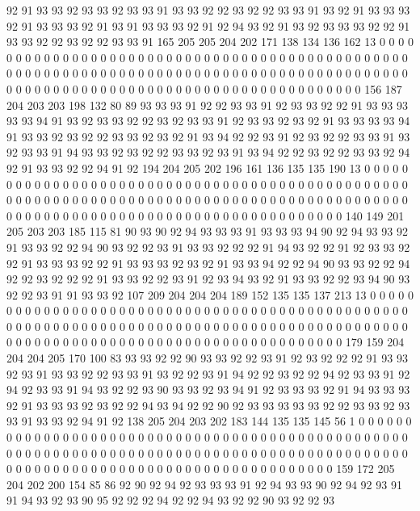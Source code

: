 92 91 93 93 92 93 93 92 93 93 91 93 93 92 92 93 92 92 93 93
91 93 92 91 93 93 93 92 91 93 93 93 92 91 93 91 93 93 93 92
91 92 94 93 92 91 93 92 93 93 93 92 92 91 93 93 92 92 93 92
92 93 93 91 165 205 205 204 202 171 138 134 136 162 13 0 0 0 0 0
0 0 0 0 0 0 0 0 0 0 0 0 0 0 0 0 0 0 0 0
0 0 0 0 0 0 0 0 0 0 0 0 0 0 0 0 0 0 0 0
0 0 0 0 0 0 0 0 0 0 0 0 0 0 0 0 0 0 0 0
0 0 0 0 0 0 0 0 0 0 0 0 0 0 0 0 0 0 0 0
0 0 0 0 0 0 0 0 0 0 0 0 0 0 0 0 0 0 0 0
0 0 0 0 0 0 0 0 0 0 0 0 0 0 0 0 0 0 0 0
0 0 0 156 187 204 203 203 198 132 80 89 93 93 93 91 92 92 93 93
91 92 93 93 92 92 91 93 93 93 93 93 94 91 93 92 93 93 92 92
93 92 93 93 91 92 93 93 92 93 92 91 93 93 93 93 94 91 93 93
92 93 92 92 93 93 92 93 92 91 93 94 92 92 93 91 92 93 92 92
93 93 91 93 92 93 93 91 94 93 93 92 93 92 92 93 93 92 93 91
93 94 92 92 93 92 92 93 93 92 94 92 91 93 93 92 92 94 91 92
194 204 205 202 196 161 136 135 135 190 13 0 0 0 0 0 0 0 0 0
0 0 0 0 0 0 0 0 0 0 0 0 0 0 0 0 0 0 0 0
0 0 0 0 0 0 0 0 0 0 0 0 0 0 0 0 0 0 0 0
0 0 0 0 0 0 0 0 0 0 0 0 0 0 0 0 0 0 0 0
0 0 0 0 0 0 0 0 0 0 0 0 0 0 0 0 0 0 0 0
0 0 0 0 0 0 0 0 0 0 0 0 0 0 0 0 0 0 0 0
0 0 0 0 0 0 0 0 0 0 0 0 0 0 0 0 0 0 140 149
201 205 203 203 185 115 81 90 93 90 92 94 93 93 93 91 93 93 93 94
90 92 94 93 93 92 91 93 93 92 92 94 90 93 92 92 93 91 93 93
92 92 92 91 94 93 92 92 91 92 93 93 92 92 91 93 93 93 92 92
91 93 93 93 92 93 92 91 93 93 94 92 92 94 90 93 93 92 92 94
92 92 93 92 92 92 91 93 93 92 92 93 91 92 93 94 93 92 91 93
93 92 92 93 94 90 93 92 92 93 91 91 93 93 92 107 209 204 204 204
189 152 135 135 137 213 13 0 0 0 0 0 0 0 0 0 0 0 0 0
0 0 0 0 0 0 0 0 0 0 0 0 0 0 0 0 0 0 0 0
0 0 0 0 0 0 0 0 0 0 0 0 0 0 0 0 0 0 0 0
0 0 0 0 0 0 0 0 0 0 0 0 0 0 0 0 0 0 0 0
0 0 0 0 0 0 0 0 0 0 0 0 0 0 0 0 0 0 0 0
0 0 0 0 0 0 0 0 0 0 0 0 0 0 0 0 0 0 0 0
0 0 0 0 0 0 0 0 0 0 0 0 0 0 179 159 204 204 204 205
170 100 83 93 93 92 92 90 93 93 92 92 93 91 92 93 92 92 92 91
93 93 92 93 91 93 93 92 92 93 93 91 93 92 92 93 91 94 92 92
93 92 92 94 92 93 93 91 92 94 92 93 93 91 94 93 92 92 93 90
93 93 92 93 94 91 92 93 93 93 92 91 94 93 93 93 92 91 93 93
93 92 93 92 92 94 93 94 92 92 90 92 93 93 93 93 93 92 92 93
93 92 93 93 91 93 93 92 94 91 92 138 205 204 203 202 183 144 135 135
145 56 1 0 0 0 0 0 0 0 0 0 0 0 0 0 0 0 0 0
0 0 0 0 0 0 0 0 0 0 0 0 0 0 0 0 0 0 0 0
0 0 0 0 0 0 0 0 0 0 0 0 0 0 0 0 0 0 0 0
0 0 0 0 0 0 0 0 0 0 0 0 0 0 0 0 0 0 0 0
0 0 0 0 0 0 0 0 0 0 0 0 0 0 0 0 0 0 0 0
0 0 0 0 0 0 0 0 0 0 0 0 0 0 0 0 0 0 0 0
0 0 0 0 0 0 0 0 0 0 159 172 205 204 202 200 154 85 86 92
90 92 94 92 93 93 93 91 92 94 93 93 90 92 94 92 93 91 91 94
93 92 93 90 95 92 92 92 94 92 92 94 93 92 92 90 93 92 92 93
